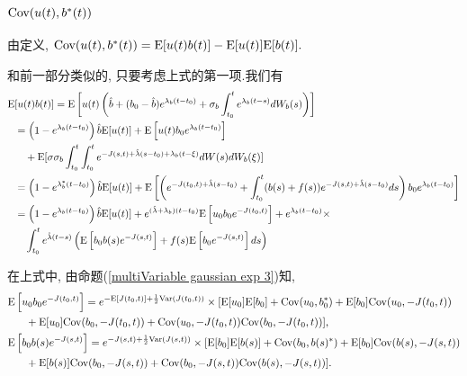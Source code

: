 \documentclass[notitlepage,cs4size,punct,oneside]{ctexrep}
\numberwithin{equation}{section}
\theoremstyle{mystyle}
\begin{document}
\subsubsection{$\text{Cov}(u(t), b^*(t))$}

由定义,
$
\text{Cov}(u(t), b^*(t)) = \text{E}[u(t)b(t)] - \text{E}[u(t)]\text{E}[b(t)].
$

和前一部分类似的, 只要考虑上式的第一项.我们有
\[
\begin{split}
\text{E}&[u(t)b(t)] = \text{E}\left[u(t)\left(\hat{b}+(b_0-\hat{b})e^{\lambda_b(t-t_0)}+\sigma_b\int_{t_0}^t e^{\lambda_b(t-s)}dW_b(s)\right)\right] \\
&= \left(1-e^{\lambda_b(t-t_0)}\right)\hat{b}\text{E}[u(t)] + \text{E}\left[u(t)b_0e^{\lambda_b(t-t_0)}\right] \\
&\quad + \text{E}[\sigma\sigma_b\int_{t_0}^t\int_{t_0}^te^{-J(s, t)+\hat\lambda(s-t_0)+\lambda_b(t-\xi)}dW(s)dW_b(\xi)] \\
&= \left(1-e^{\lambda_b^*(t-t_0)}\right)\hat{b}\text{E}[u(t)] + \text{E}\left[\left(e^{-J(t_0, t)+\hat\lambda(s-t_0)}+\int_{t_0}^t (b(s)+f(s))e^{-J(s, t)+\hat\lambda(s-t_0)}ds\right)b_0e^{\lambda_b(t-t_0)}\right] \\
&= \left(1-e^{\lambda_b(t-t_0)}\right)\hat{b}\text{E}[u(t)] + e^{(\hat\lambda+\lambda_b)(t-t_0)}\text{E}\left[u_0b_0e^{-J(t_0, t)}\right] + e^{\lambda_b(t-t_0)}\times \\
&\quad \int_{t_0}^t e^{\hat\lambda(t-s)}\left(\text{E}\left[b_0b(s)e^{-J(s, t)}\right]+f(s)\text{E}\left[b_0e^{-J(s, t)}\right]ds\right) \\
\end{split}
\]

在上式中, 由命题(\ref{multiVariable gaussian exp 3})知,
\[
\begin{split}
\text{E}&\left[u_0b_0e^{-J(t_0, t)}\right] = e^{-\text{E}[J(t_0, t)]+\frac{1}{2}\text{Var}(J(t_0, t))}\times[\text{E}[u_0]\text{E}[b_0]+\text{Cov}(u_0, b_0^*)+\text{E}[b_0]\text{Cov}(u_0, -J(t_0, t))\\
&\quad + \text{E}[u_0]\text{Cov}(b_0, -J(t_0, t))+\text{Cov}(u_0, -J(t_0, t))\text{Cov}(b_0, -J(t_0, t))], \\
\text{E}&\left[b_0b(s)e^{-J(s, t)}\right] = e^{-J(s, t)+\frac{1}{2}\text{Var}(J(s, t))}\times [\text{E}[b_0]\text{E}[b(s)]+\text{Cov}(b_0, b(s)^*)+\text{E}[b_0]\text{Cov}(b(s), -J(s, t)) \\
&\quad + \text{E}[b(s)]\text{Cov}(b_0, -J(s, t)) + \text{Cov}(b_0, -J(s, t))\text{Cov}(b(s), -J(s, t))].
\end{split}
\]
\end{document}
